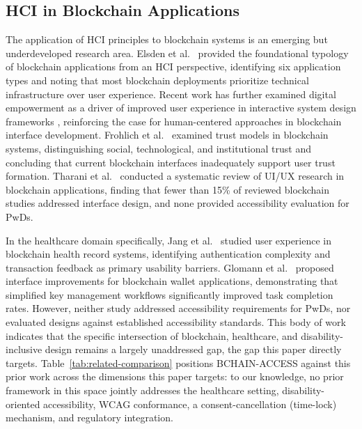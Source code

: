 \documentclass[journal,onecolumn]{IEEEtran}
\begin{document}
\subsection{HCI in Blockchain Applications}
The application of HCI principles to blockchain systems is an emerging but underdeveloped research area. Elsden et al.~\cite{elsden2018making} provided the foundational typology of blockchain applications from an HCI perspective, identifying six application types and noting that most blockchain deployments prioritize technical infrastructure over user experience. Recent work has further examined digital empowerment as a driver of improved user experience in interactive system design frameworks \cite{wang2025digital}, reinforcing the case for human-centered approaches in blockchain interface development. Frohlich et al.~\cite{frohlich2022blockchain} examined trust models in blockchain systems, distinguishing social, technological, and institutional trust and concluding that current blockchain interfaces inadequately support user trust formation. Tharani et al.~\cite{tharani2022ui} conducted a systematic review of UI/UX research in blockchain applications, finding that fewer than 15\% of reviewed blockchain studies addressed interface design, and none provided accessibility evaluation for PwDs.

In the healthcare domain specifically, Jang et al.~\cite{jang2020user} studied user experience in blockchain health record systems, identifying authentication complexity and transaction feedback as primary usability barriers. Glomann et al.~\cite{Glomann2019ImprovingTB} proposed interface improvements for blockchain wallet applications, demonstrating that simplified key management workflows significantly improved task completion rates. However, neither study addressed accessibility requirements for PwDs, nor evaluated designs against established accessibility standards. This body of work indicates that the specific intersection of blockchain, healthcare, and disability-inclusive design remains a largely unaddressed gap, the gap this paper directly targets. Table~\ref{tab:related-comparison} positions BCHAIN-ACCESS against this prior work across the dimensions this paper targets: to our knowledge, no prior framework in this space jointly addresses the healthcare setting, disability-oriented accessibility, WCAG conformance, a consent-cancellation (time-lock) mechanism, and regulatory integration.
\end{document}
